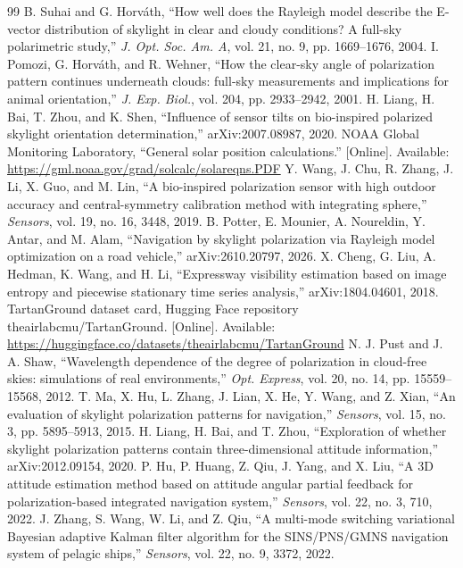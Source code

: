 \begin{thebibliography}{99}
 B. Suhai and G. Horv\'ath, ``How well does the Rayleigh model describe the E-vector distribution of skylight in clear and cloudy conditions? A full-sky polarimetric study,'' \emph{J. Opt. Soc. Am. A}, vol. 21, no. 9, pp. 1669--1676, 2004.
 I. Pomozi, G. Horv\'ath, and R. Wehner, ``How the clear-sky angle of polarization pattern continues underneath clouds: full-sky measurements and implications for animal orientation,'' \emph{J. Exp. Biol.}, vol. 204, pp. 2933--2942, 2001.
 H. Liang, H. Bai, T. Zhou, and K. Shen, ``Influence of sensor tilts on bio-inspired polarized skylight orientation determination,'' arXiv:2007.08987, 2020.
 NOAA Global Monitoring Laboratory, ``General solar position calculations.'' [Online]. Available: \url{https://gml.noaa.gov/grad/solcalc/solareqns.PDF}
 Y. Wang, J. Chu, R. Zhang, J. Li, X. Guo, and M. Lin, ``A bio-inspired polarization sensor with high outdoor accuracy and central-symmetry calibration method with integrating sphere,'' \emph{Sensors}, vol. 19, no. 16, 3448, 2019.
 B. Potter, E. Mounier, A. Noureldin, Y. Antar, and M. Alam, ``Navigation by skylight polarization via Rayleigh model optimization on a road vehicle,'' arXiv:2610.20797, 2026.
 X. Cheng, G. Liu, A. Hedman, K. Wang, and H. Li, ``Expressway visibility estimation based on image entropy and piecewise stationary time series analysis,'' arXiv:1804.04601, 2018.
 TartanGround dataset card, Hugging Face repository theairlabcmu/TartanGround. [Online]. Available: \url{https://huggingface.co/datasets/theairlabcmu/TartanGround}
 N. J. Pust and J. A. Shaw, ``Wavelength dependence of the degree of polarization in cloud-free skies: simulations of real environments,'' \emph{Opt. Express}, vol. 20, no. 14, pp. 15559--15568, 2012.
 T. Ma, X. Hu, L. Zhang, J. Lian, X. He, Y. Wang, and Z. Xian, ``An evaluation of skylight polarization patterns for navigation,'' \emph{Sensors}, vol. 15, no. 3, pp. 5895--5913, 2015.
 H. Liang, H. Bai, and T. Zhou, ``Exploration of whether skylight polarization patterns contain three-dimensional attitude information,'' arXiv:2012.09154, 2020.
 P. Hu, P. Huang, Z. Qiu, J. Yang, and X. Liu, ``A 3D attitude estimation method based on attitude angular partial feedback for polarization-based integrated navigation system,'' \emph{Sensors}, vol. 22, no. 3, 710, 2022.
 J. Zhang, S. Wang, W. Li, and Z. Qiu, ``A multi-mode switching variational Bayesian adaptive Kalman filter algorithm for the SINS/PNS/GMNS navigation system of pelagic ships,'' \emph{Sensors}, vol. 22, no. 9, 3372, 2022.

\end{thebibliography}
